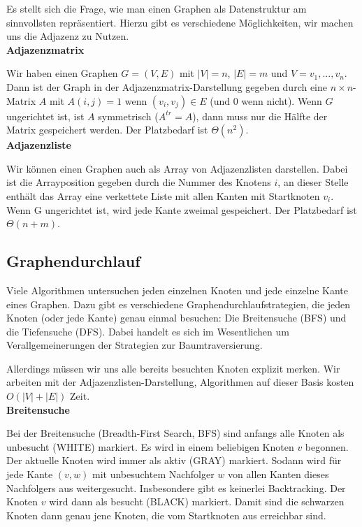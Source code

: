 \documentclass[12pt]{article}
\begin{document}
Es stellt sich die Frage, wie man einen Graphen als Datenstruktur am sinnvollsten repräsentiert. Hierzu gibt es verschiedene Möglichkeiten, wir machen uns die Adjazenz zu Nutzen.\\

\textbf{Adjazenzmatrix}

Wir haben einen Graphen $G = (V, E)$ mit $|V| = n$, $|E| = m$ und $V = {v_1, ..., v_n}$. Dann ist der Graph in der Adjazenzmatrix-Darstellung gegeben durch eine $n \times n$-Matrix $A$ mit $A(i, j) = 1$ wenn $(v_i, v_j) \in E$ (und $0$ wenn nicht). Wenn $G$ ungerichtet ist, ist $A$ symmetrisch ($A^{tr} = A$), dann muss nur die Hälfte der Matrix gespeichert werden. Der Platzbedarf ist $\Theta(n^2)$.\\

\textbf{Adjazenzliste}

Wir können einen Graphen auch als Array von Adjazenzlisten darstellen. Dabei ist die Arrayposition gegeben durch die Nummer des Knotens $i$, an dieser Stelle enthält das Array eine verkettete Liste mit allen Kanten mit Startknoten $v_i$. Wenn G ungerichtet ist, wird jede Kante zweimal gespeichert. Der Platzbedarf ist $\Theta(n+m)$.

\subsection{Graphendurchlauf}

Viele Algorithmen untersuchen jeden einzelnen Knoten und jede einzelne Kante eines Graphen. Dazu gibt es verschiedene Graphendurchlaufstrategien, die jeden Knoten (oder jede Kante) genau einmal besuchen: Die Breitensuche (BFS) und die Tiefensuche (DFS). Dabei handelt es sich im Wesentlichen um Verallgemeinerungen der Strategien zur Baumtraversierung.

Allerdings müssen wir uns alle bereits besuchten Knoten explizit merken. Wir arbeiten mit der Adjazenzlisten-Darstellung, Algorithmen auf dieser Basis kosten $O(|V| + |E|)$ Zeit.\\

\textbf{Breitensuche}

Bei der Breitensuche (Breadth-First Search, BFS) sind anfangs alle Knoten als unbesucht (WHITE) markiert. Es wird in einem beliebigen Knoten $v$ begonnen. Der aktuelle Knoten wird immer als aktiv (GRAY) markiert. Sodann wird für jede Kante $(v, w)$ mit unbesuchtem Nachfolger $w$ von allen Kanten dieses Nachfolgers aus weitergesucht. Insbesondere gibt es keinerlei Backtracking. Der Knoten $v$ wird dann als besucht (BLACK) markiert. Damit sind die schwarzen Knoten dann genau jene Knoten, die vom Startknoten aus erreichbar sind.
\end{document}
